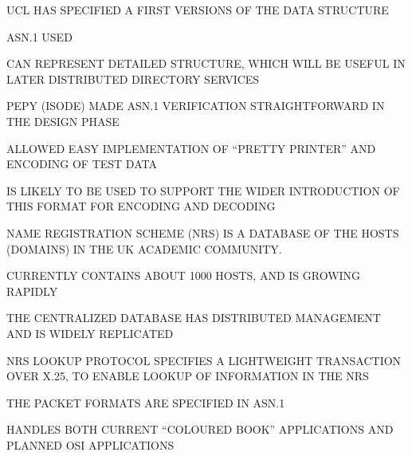 \begin{bwslide}

\begin{nrtc}
\item	UCL HAS SPECIFIED A FIRST VERSIONS OF THE DATA STRUCTURE

\item	ASN.1 USED

\item	CAN REPRESENT DETAILED STRUCTURE, WHICH WILL BE USEFUL IN
	LATER DISTRIBUTED DIRECTORY SERVICES

\item	PEPY (ISODE) MADE ASN.1 VERIFICATION STRAIGHTFORWARD IN THE
	DESIGN PHASE

\item	ALLOWED EASY IMPLEMENTATION OF ``PRETTY PRINTER'' AND
	ENCODING OF TEST DATA

\item	IS LIKELY TO BE USED TO SUPPORT THE WIDER INTRODUCTION OF
	THIS FORMAT FOR ENCODING AND DECODING
\end{nrtc}
\end{bwslide}


\begin{bwslide}

\begin{nrtc}
\item	NAME REGISTRATION SCHEME (NRS) IS A DATABASE OF THE HOSTS
	(DOMAINS) IN THE UK ACADEMIC COMMUNITY.

\item	CURRENTLY CONTAINS ABOUT 1000 HOSTS, AND IS GROWING RAPIDLY

\item	THE CENTRALIZED DATABASE HAS DISTRIBUTED MANAGEMENT AND
	IS WIDELY REPLICATED

\item	NRS LOOKUP PROTOCOL SPECIFIES A LIGHTWEIGHT TRANSACTION
	OVER X.25, TO ENABLE LOOKUP OF INFORMATION IN THE NRS

\item	THE PACKET FORMATS ARE SPECIFIED IN ASN.1

\item	HANDLES BOTH CURRENT ``COLOURED BOOK'' APPLICATIONS AND
	PLANNED OSI APPLICATIONS
\end{nrtc}
\end{bwslide}


